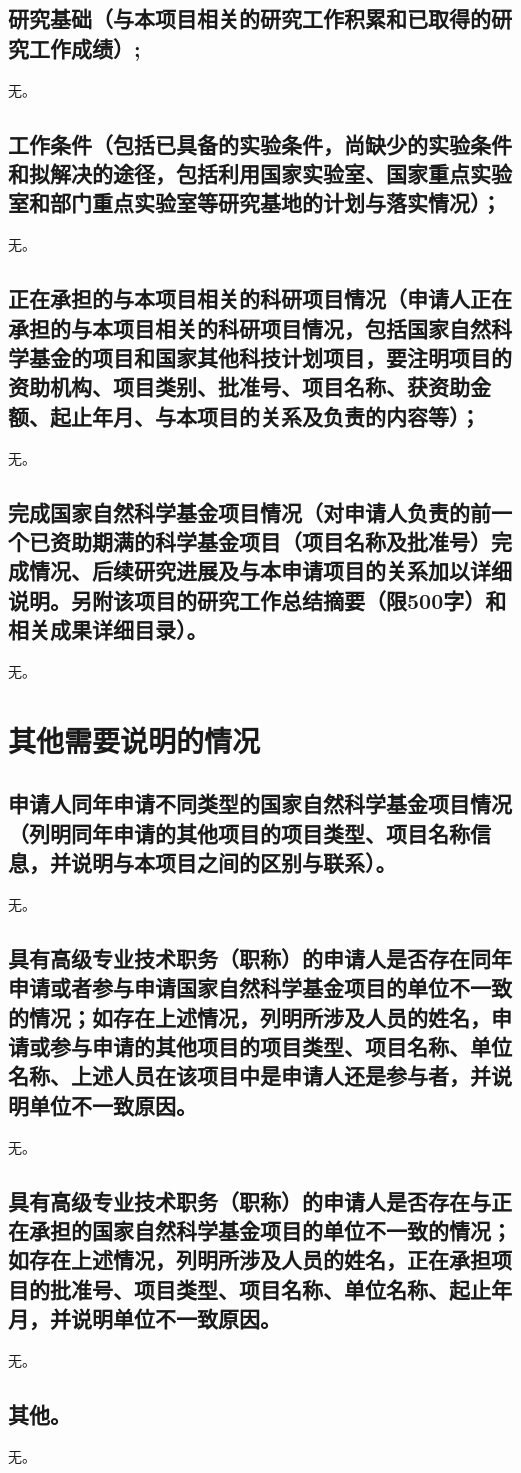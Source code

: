 \documentclass{nsfc}
\begin{document}
\section{\textbf{研究基础}（与本项目相关的研究工作积累和已取得的研究工作成绩）;}

无。

\section{\textbf{工作条件}（包括已具备的实验条件，尚缺少的实验条件和拟解决的途径，包括利用国家实验室、国家重点实验室和部门重点实验室等研究基地的计划与落实情况）；}

无。

\section{\textbf{正在承担的与本项目相关的科研项目情况}（申请人正在承担的与本项目相关的科研项目情况，包括国家自然科学基金的项目和国家其他科技计划项目，要注明项目的资助机构、项目类别、批准号、项目名称、获资助金额、起止年月、与本项目的关系及负责的内容等）；}

无。

\section{\textbf{完成国家自然科学基金项目情况}（对申请人负责的前一个已资助期满的科学基金项目（项目名称及批准号）完成情况、后续研究进展及与本申请项目的关系加以详细说明。另附该项目的研究工作总结摘要（限500字）和相关成果详细目录）。}

无。

\chapter{其他需要说明的情况}

\section{申请人同年申请不同类型的国家自然科学基金项目情况（列明同年申请的其他项目的项目类型、项目名称信息，并说明与本项目之间的区别与联系）。}

无。

\section{具有高级专业技术职务（职称）的申请人是否存在同年申请或者参与申请国家自然科学基金项目的单位不一致的情况；如存在上述情况，列明所涉及人员的姓名，申请或参与申请的其他项目的项目类型、项目名称、单位名称、上述人员在该项目中是申请人还是参与者，并说明单位不一致原因。}

无。

\section{具有高级专业技术职务（职称）的申请人是否存在与正在承担的国家自然科学基金项目的单位不一致的情况；如存在上述情况，列明所涉及人员的姓名，正在承担项目的批准号、项目类型、项目名称、单位名称、起止年月，并说明单位不一致原因。}

无。

\section{其他。}

无。
\end{document}
